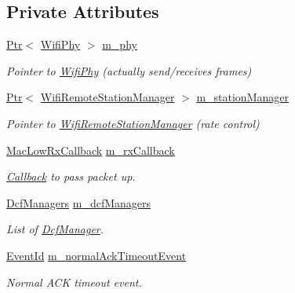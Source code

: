 \subsection*{Private Attributes}
\begin{DoxyCompactItemize}
\item 
\hyperlink{classns3_1_1Ptr}{Ptr}$<$ \hyperlink{classns3_1_1WifiPhy}{Wifi\+Phy} $>$ \hyperlink{classns3_1_1MacLow_aec8aefec9501f9d7c06b6cd0ee1353ee}{m\+\_\+phy}
\begin{DoxyCompactList}\small\item\em Pointer to \hyperlink{classns3_1_1WifiPhy}{Wifi\+Phy} (actually send/receives frames) \end{DoxyCompactList}\item 
\hyperlink{classns3_1_1Ptr}{Ptr}$<$ \hyperlink{classns3_1_1WifiRemoteStationManager}{Wifi\+Remote\+Station\+Manager} $>$ \hyperlink{classns3_1_1MacLow_a1c7f45f071f9e5eb97764f64e5cdaf1b}{m\+\_\+station\+Manager}
\begin{DoxyCompactList}\small\item\em Pointer to \hyperlink{classns3_1_1WifiRemoteStationManager}{Wifi\+Remote\+Station\+Manager} (rate control) \end{DoxyCompactList}\item 
\hyperlink{classns3_1_1MacLow_a1b2eb70255904d5aad88c6a6adbf6224}{Mac\+Low\+Rx\+Callback} \hyperlink{classns3_1_1MacLow_ac5f2b06b6151c99816c66b7bf946a4d8}{m\+\_\+rx\+Callback}
\begin{DoxyCompactList}\small\item\em \hyperlink{classns3_1_1Callback}{Callback} to pass packet up. \end{DoxyCompactList}\item 
\hyperlink{classns3_1_1MacLow_a22c50ed96b7e6b6cebe789abf1ce006b}{Dcf\+Managers} \hyperlink{classns3_1_1MacLow_adf307ef209557c58594aeaa3679187bc}{m\+\_\+dcf\+Managers}
\begin{DoxyCompactList}\small\item\em List of \hyperlink{classns3_1_1DcfManager}{Dcf\+Manager}. \end{DoxyCompactList}\item 
\hyperlink{classns3_1_1EventId}{Event\+Id} \hyperlink{classns3_1_1MacLow_a4376c10e5dc680bcdb50628540c8b412}{m\+\_\+normal\+Ack\+Timeout\+Event}
\begin{DoxyCompactList}\small\item\em Normal A\+CK timeout event. \end{DoxyCompactList}\item 

\end{DoxyCompactItemize}
